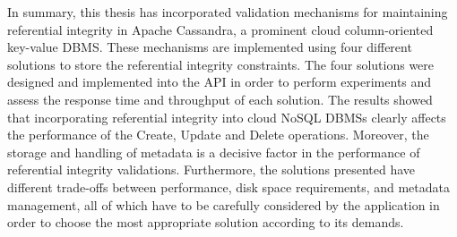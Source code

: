 In summary, this thesis has incorporated validation mechanisms for maintaining
referential integrity  in Apache Cassandra,  a prominent cloud column-oriented
key-value \ac{DBMS}. These mechanisms are implemented using four different
solutions to store the referential integrity constraints. The four solutions
were designed and implemented into the \ac{API} in order to perform experiments
and assess the response time and throughput of each solution. The results showed
that incorporating referential integrity into cloud NoSQL \acp{DBMS} clearly
affects the performance of the Create, Update and Delete operations. Moreover,
the storage and handling of metadata is a decisive factor in the performance of
referential integrity validations. Furthermore, the solutions presented have
different trade-offs between performance, disk space requirements, and metadata
management, all of which have to be carefully considered by the  application in
order to choose the most appropriate solution according to its demands.




% 


